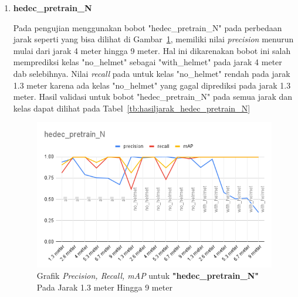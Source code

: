 \begin{enumerate}
  \item \textbf{hedec\_pretrain\_N}
  
  \par Pada pengujian menggunakan bobot "hedec\_pretrain\_N" pada perbedaan jarak seperti yang bisa dilihat di Gambar~\ref{fig:grafvaljarak_hedec_pretrain_N}, memiliki nilai
  \emph{precision} menurun mulai dari jarak 4 meter hingga 9 meter. Hal ini dikarenakan bobot ini salah memprediksi kelas "no\_helmet" sebagai "with\_helmet" pada jarak 4 meter
  dab selebihnya. Nilai \emph{recall} pada untuk kelas "no\_helmet" rendah pada jarak 1.3 meter karena ada kelas "no\_helmet" yang
  gagal diprediksi pada jarak 1.3 meter. Hasil validasi untuk bobot "hedec\_pretrain\_N" pada semua jarak dan kelas dapat dilihat pada Tabel~\ref{tb:hasiljarak_hedec_pretrain_N}

  \begin{figure} [h!]
    \centering
    \includegraphics[width=1\textwidth]{gambar/BerdasarkanJarak/hedec_pretrain_N.png}
    \caption{Grafik \emph{Precision, Recall, mAP} untuk \textbf{"hedec\_pretrain\_N"} Pada Jarak 1.3 meter Hingga 9 meter}
    \label{fig:grafvaljarak_hedec_pretrain_N}  
  \end{figure}

 


\end{enumerate}
